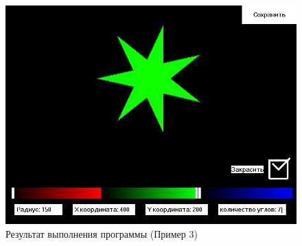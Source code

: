 \documentclass[14pt, a4paper]{extreport}
\begin{document}
\begin{figure}[h!]
	\centering
	\includegraphics[width = 12cm]{image/image_3}
  \caption{Результат выполнения программы (Пример 3)}
\end{figure}

\end{document}
